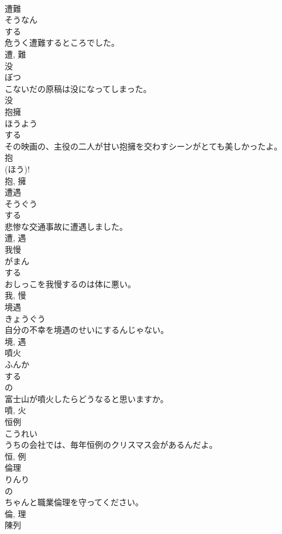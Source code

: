 \documentclass[8pt]{extreport}
\begin{document}
\begin{CJK}{UTF8}{min}
\\	遭難	
\\	そうなん	
\\	する 
\\	危うく遭難するところでした。	
\\	遭, 難	
\\	没	
\\	ぼつ	
\\	こないだの原稿は没になってしまった。	
\\	没	
\\	抱擁	
\\	ほうよう	
\\	する 
\\	その映画の、主役の二人が甘い抱擁を交わすシーンがとても美しかったよ。	
\\	抱 
\\	(ほう)! 
\\	抱, 擁	
\\	遭遇	
\\	そうぐう	
\\	する 
\\	悲惨な交通事故に遭遇しました。	
\\	遭, 遇	
\\	我慢	
\\	がまん	
\\	する 
\\	おしっこを我慢するのは体に悪い。	
\\	我, 慢	
\\	境遇	
\\	きょうぐう	
\\	自分の不幸を境遇のせいにするんじゃない。	
\\	境, 遇	
\\	噴火	
\\	ふんか	
\\	する 
\\	の 
\\	富士山が噴火したらどうなると思いますか。	
\\	噴, 火	
\\	恒例	
\\	こうれい	
\\	うちの会社では、毎年恒例のクリスマス会があるんだよ。	
\\	恒, 例	
\\	倫理	
\\	りんり	
\\	の 
\\	ちゃんと職業倫理を守ってください。	
\\	倫, 理	
\\	陳列	

\end{CJK}
\end{document}
